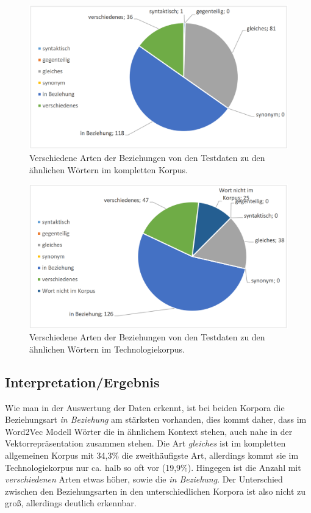 \documentclass[12pt,a4paper]{report}
\begin{document}
\begin{figure}[p]
  \begin{center}
	\includegraphics[scale=0.4]{BeziehungsartenFull.PNG}
  \end{center}  
  \caption{Verschiedene Arten der Beziehungen von den Testdaten zu den ähnlichen Wörtern im kompletten Korpus.}

\end{figure}
\begin{figure}[p]
  \begin{center}
	\includegraphics[scale=0.4]{BeziehungsartenTech.PNG}
  \end{center}  
  \caption{Verschiedene Arten der Beziehungen von den Testdaten zu den ähnlichen Wörtern im Technologiekorpus.}
  \end{figure}			
		
		
		
		\newpage
		\subsection{Interpretation/Ergebnis}
		Wie man in der Auswertung der Daten erkennt, ist bei beiden Korpora die Beziehungsart \textit{in Beziehung} am stärksten vorhanden, dies kommt daher, dass im Word2Vec Modell Wörter die in ähnlichem Kontext stehen, auch nahe in der Vektorrepräsentation zusammen stehen. Die Art \textit{gleiches} ist im kompletten allgemeinen Korpus mit 34,3\% die zweithäufigste Art, allerdings kommt sie im Technologiekorpus nur ca. halb so oft vor (19,9\%). Hingegen ist die Anzahl mit \textit{verschiedenen} Arten etwas höher, sowie die \textit{in Beziehung}. Der Unterschied zwischen den Beziehungsarten in den unterschiedlichen Korpora ist also nicht zu groß, allerdings deutlich erkennbar.\\
		
\end{document}
